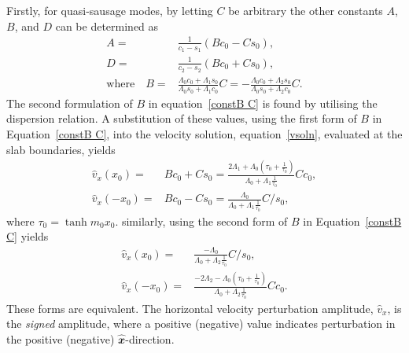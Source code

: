 \documentclass[namedreferences]{solarphysics}
\numberwithin{equation}{section}
\begin{document}
\begin{article}
Firstly, for quasi-sausage modes, by letting $C$ be arbitrary the other constants $A$, $B$, and $D$ can be determined as
\begin{align}
A=&\frac{1}{c_1-s_1}(Bc_0-Cs_0), \label{constA C} \\ 
D=&\frac{1}{c_2-s_2}(Bc_0+Cs_0), \label{constD C} \\
\text{where} \quad B=&\frac{\Lambda_0c_0+\Lambda_1s_0}{\Lambda_0s_0+\Lambda_1c_0}C=-\frac{\Lambda_0c_0+\Lambda_2s_0}{\Lambda_0s_0+\Lambda_2c_0}C. \label{constB C}
\end{align}
The second formulation of $B$ in equation~\eqref{constB C} is found by utilising the dispersion relation. A substitution of these values, using the first form of $B$ in Equation~\eqref{constB C}, into the velocity solution, equation~\eqref{vsoln}, evaluated at the slab boundaries, yields
\begin{align}
\widehat{v}_x(x_0) =& Bc_0+Cs_0 = \frac{2\Lambda_1+\Lambda_0\left(\tau_0+\frac{1}{\tau_0}\right)}{\Lambda_0+\Lambda_1\frac{1}{\tau_0}}Cc_0, \label{vx_01 C} \\
\widehat{v}_x(-x_0) =& Bc_0-Cs_0 = \frac{\Lambda_0}{\Lambda_0+\Lambda_1\frac{1}{\tau_0}}C/s_0, \label{v-x_01 C}
\end{align}
where $\tau_0=\tanh{m_0x_0}$. similarly, using the second form of $B$ in Equation~\eqref{constB C} yields
\begin{align}
\widehat{v}_x(x_0)=&\frac{-\Lambda_0}{\Lambda_0+\Lambda_2\frac{1}{\tau_0}}C/s_0, \label{vx_02 C} \\
\widehat{v}_x(-x_0)=&\frac{-2\Lambda_2-\Lambda_0\left(\tau_0+\frac{1}{\tau_0}\right)}{\Lambda_0+\Lambda_2\frac{1}{\tau_0}}Cc_0. \label{v-x_02 C}
\end{align}
These forms are equivalent. The horizontal velocity perturbation amplitude, $\widehat{v}_x$, is the \emph{signed} amplitude, where a positive (negative) value indicates perturbation in the positive (negative) $\mathbfit{\widehat{x}}$-direction.


\end{article}
\end{document}
